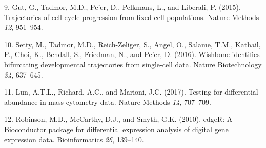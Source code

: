 \documentclass[
]{article}
\newenvironment{cslreferences}%
  {}%
  {\par}
\begin{document}
\begin{cslreferences}
\leavevmode\hypertarget{ref-gutTrajectoriesCellcycleProgression2015}{}%
9. Gut, G., Tadmor, M.D., Pe'er, D., Pelkmans, L., and Liberali, P. (2015). Trajectories of cell-cycle progression from fixed cell populations. Nature Methods \emph{12}, 951--954.

\leavevmode\hypertarget{ref-settyWishboneIdentifiesBifurcating2016}{}%
10. Setty, M., Tadmor, M.D., Reich-Zeliger, S., Angel, O., Salame, T.M., Kathail, P., Choi, K., Bendall, S., Friedman, N., and Pe'er, D. (2016). Wishbone identifies bifurcating developmental trajectories from single-cell data. Nature Biotechnology \emph{34}, 637--645.

\leavevmode\hypertarget{ref-lunTestingDifferentialAbundance2017}{}%
11. Lun, A.T.L., Richard, A.C., and Marioni, J.C. (2017). Testing for differential abundance in mass cytometry data. Nature Methods \emph{14}, 707--709.

\leavevmode\hypertarget{ref-robinsonEdgeRBioconductorPackage2010a}{}%
12. Robinson, M.D., McCarthy, D.J., and Smyth, G.K. (2010). edgeR: A Bioconductor package for differential expression analysis of digital gene expression data. Bioinformatics \emph{26}, 139--140.
\end{cslreferences}
\end{document}

